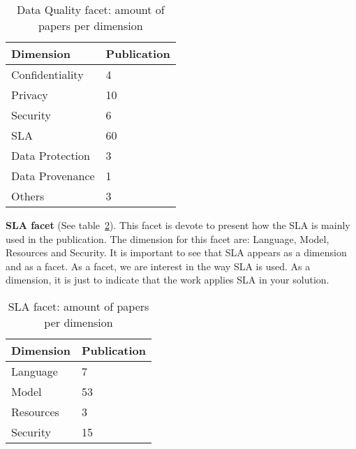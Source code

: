 \begin{table}[!h]
\begin{center}
\begin{tabular}{p{4cm}p{4cm}}
\hline 
\textbf{Dimension} & \textbf{Publication} \\ 
\hline 
Confidentiality & 4 \\ 
\hline 
Privacy & 10 \\ 
\hline 
Security & 6 \\ 
\hline 
SLA  & 60\\
\hline 
Data Protection & 3 \\ 
\hline 
Data Provenance & 1 \\ 
\hline 
Others & 3 \\ 
\hline 
\end{tabular}
\end{center}
\caption{Data Quality facet: amount of papers per dimension}\label{table:dq}
\end{table}

\textbf{SLA facet} (See table~\ref{table:sla}).
This facet is devote to present how the SLA is mainly used in the publication. 
The dimension for this facet are: Language, Model, Resources and Security.
It is important to see that SLA appears as a dimension and as a facet.
As a facet, we are interest in the way SLA is used. 
As a dimension, it is just to indicate that the work
applies SLA in your solution.

\begin{table}[h]
\begin{center}
\begin{tabular}{p{4cm}p{4cm}}
\hline 
\textbf{Dimension} & \textbf{Publication} \\ 
\hline 
Language & 7 \\ 
\hline 
Model & 53 \\ 
\hline 
Resources & 3 \\ 
\hline 
Security & 15 \\ 
\hline 
\end{tabular}
\end{center}
\caption{SLA facet: amount of papers per dimension}\label{table:sla}
\end{table}

